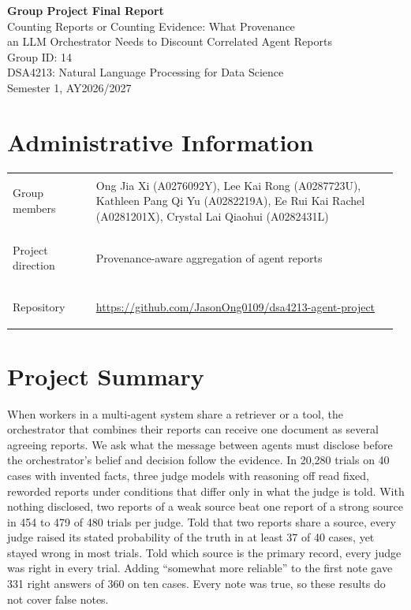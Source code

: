 \documentclass[11pt]{article}
\begin{document}
\begin{center}
{\LARGE\bfseries Group Project Final Report}\\[.3em]
{\large Counting Reports or Counting Evidence: What Provenance\\
an LLM Orchestrator Needs to Discount Correlated Agent Reports}\\[.5em]
Group ID: 14\\[.3em]
DSA4213: Natural Language Processing for Data Science\\
Semester 1, AY2026/2027
\end{center}

\section*{Administrative Information}
\noindent\begin{tabular}{@{}>{\bfseries\raggedright\arraybackslash}p{0.21\linewidth}
                    >{\raggedright\arraybackslash}p{0.76\linewidth}@{}}
Group members & Ong Jia Xi (A0276092Y), Lee Kai Rong (A0287723U), Kathleen Pang Qi Yu (A0282219A), Ee Rui Kai Rachel (A0281201X), Crystal Lai Qiaohui (A0282431L)\\
Project direction & Provenance-aware aggregation of agent reports\\
Repository & \url{https://github.com/JasonOng0109/dsa4213-agent-project}\\
\end{tabular}

\section*{Project Summary}
\noindent When workers in a multi-agent system share a retriever or a tool, the orchestrator that combines their reports can receive one document as several agreeing reports. We ask what the message between agents must disclose before the orchestrator's belief and decision follow the evidence. In 20,280 trials on 40 cases with invented facts, three judge models with reasoning off read fixed, reworded reports under conditions that differ only in what the judge is told. With nothing disclosed, two reports of a weak source beat one report of a strong source in 454 to 479 of 480 trials per judge. Told that two reports share a source, every judge raised its stated probability of the truth in at least 37 of 40 cases, yet stayed wrong in most trials. Told which source is the primary record, every judge was right in every trial. Adding ``somewhat more reliable'' to the first note gave 331 right answers of 360 on ten cases. Every note was true, so these results do not cover false notes.
\end{document}

